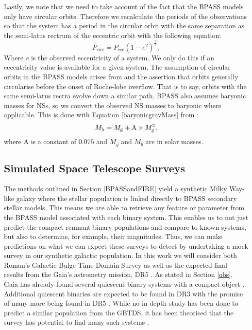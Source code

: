 \documentclass{pas}
\begin{document}
Lastly, we note that we need to take account of the fact that the \textsc{BPASS} models only have circular orbits. Therefore we recalculate the periods of the observations so that the system has a period in the circular orbit with the same separation as the semi-latus rectrum of the eccentric orbit with the following equation:
\begin{equation}\label{circularise}
    P_\text{circ}=P_\text{ecc}(1-e^{2})^{\frac{3}{2}},
\end{equation}
Where \textit{e} is the observed eccentricity of a system. We only do this if an eccentricity value is available for a given system. The assumption of circular orbits in the \textsc{BPASS} models arises from \citet{2002MNRAS.329..897H} and the assertion that orbits generally circularise before the onset of Roche-lobe overflow. That is to say, orbits with the same semi-latus rectra evolve down a similar path. \textsc{BPASS} also assumes baryonic masses for NSs, so we convert the observed NS masses to baryonic where applicable. This is done with Equation \ref{baryonicgravMass} from \citet{2020FrPhy..1524603G}:
\begin{equation}\label{baryonicgravMass}
    {M_{\rm b}=M_{\rm g}+ {\rm{A}} \times{M_{\rm g}^2}},
\end{equation}
where A is a constant of $0.075$ and $M_g$ and $M_b$ are in solar masses. 

\subsection{Simulated Space Telescope Surveys}\label{spacetelesim}

The methods outlined in Section \ref{BPASSandFIRE} yield a synthetic Milky Way-like galaxy where the stellar population is linked directly to \textsc{BPASS} secondary stellar models. This means we are able to retrieve any feature or parameter from the \textsc{BPASS} model associated with each binary system. This enables us to not just predict the compact remnant binary populations and compare to known systems, but also to determine, for example, their magnitudes. Thus, we can make predictions on what we can expect these surveys to detect by undertaking a mock survey in our synthetic galactic population. In this work we will consider both Roman's Galactic Bulge Time Domain Survey \citep[][GBTDS]{committee2025romanobservationstimeallocation} as well as the expected final results from the Gaia's astrometry mission, DR5 \citep{2023A&A...674A...1G}. As stated in Section \ref{obs}, Gaia has already found several quiescent binary systems with a compact object \citep{El_Badry2023-1, El_Badry2023, elbadry2024populationneutronstarcandidates, BH3_2024}. Additional quiescent binaries are expected to be found in DR3 with the promise of many more being found in DR5 \citep{Chawla_2022, 2024NewAR..9801694E, 2025arXiv250821805C, 2025PASP..137d4202N}. While no in depth study has been done to predict a similar population from the GBTDS, it has been theorised that the survey has potential to find many such systems \citep{RomanWP, 2024arXiv240614767K}.
\end{document}
